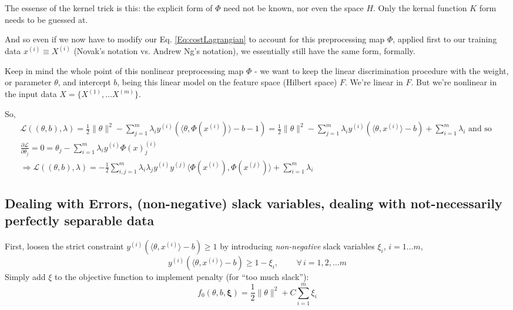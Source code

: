 \documentclass[10pt]{amsart}
\begin{document}
\begin{multicols*}{2}
The essense of the kernel trick is this: the explicit form of $\Phi$ need not be known, nor even the space $H$.  Only the kernal function $K$ form needs to be guessed at.  

And so even if we now have to modify our Eq. \ref{Eq:costLagrangian} to account for this preprocessing map $\Phi$, applied first to our training data $x^{(i)} \equiv X^{(i)}$ (Novak's notation vs. Andrew Ng's notation), we essentially still have the same form, formally.

Keep in mind the whole point of this nonlinear preprocessing map $\Phi$ - we want to keep the linear discrimination procedure with the weight, or parameter $\theta$, and intercept $b$, being this linear model on the feature space (Hilbert space) $F$.  We're linear in $F$.  But we're nonlinear in the input data $X=\lbrace X^{(1)},\dots X^{(m)}\rbrace$.

So,
\begin{equation}
  \begin{gathered}
    \mathcal{L}((\theta,b),\lambda) = \frac{1}{2} \| \theta\|^2 - \sum_{j=1}^m \lambda_i y^{(i)}(\langle \theta, \Phi(x^{(i)}) \rangle - b - 1)   =  \frac{1}{2} \| \theta\|^2 - \sum_{j=1}^m \lambda_i y^{(i)}(\langle \theta, x^{(i)} \rangle - b) +\sum_{i=1}^m \lambda_i \text{ and so } \\
    \frac{ \partial \mathcal{L}}{ \partial \theta_j} = 0 = \theta_j - \sum_{i=1}^m \lambda_i y^{(i)} \Phi(x)^{(i)}_j \\
    \Longrightarrow \mathcal{L}((\theta,b),\lambda) = -\frac{1}{2} \sum_{i,j=1}^m \lambda_i \lambda_j y^{(i)} y^{(j)} \langle \Phi(x^{(i)}) , \Phi(x^{(j)}) \rangle + \sum_{i=1}^m \lambda_i
    \end{gathered}
  \end{equation}

\subsection{Dealing with Errors, (non-negative) slack variables, dealing with not-necessarily perfectly separable data}

First, loosen the strict constraint $y^{(i)}(\langle \theta,x^{(i)} \rangle - b) \geq 1$ by introducing \emph{non-negative} slack variables $\xi_i$, $i=1\dots m$,
\begin{equation}
  y^{(i)}(\langle \theta, x^{(i)} \rangle - b) \geq 1 - \xi_i, \qquad \, \forall \, i = 1,2, \dots m 
\end{equation}
Simply add $\xi$ to the objective function to implement penalty (for ``too much slack''):
\begin{equation}
  f_0(\theta,b,\mathbf{\xi}) = \frac{1}{2} \| \theta \|^2 + C\sum_{i=1}^m \xi_i
  \end{equation}




\end{multicols*}
\end{document}
